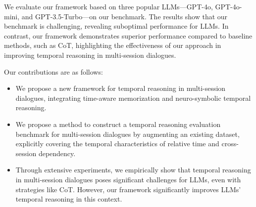 We evaluate our framework based on three popular LLMs—GPT-4o, GPT-4o-mini, and GPT-3.5-Turbo—on our benchmark. The results show that our benchmark is challenging, revealing suboptimal performance for LLMs. In contrast, our framework demonstrates superior performance compared to baseline methods, such as CoT, highlighting the effectiveness of our approach in improving temporal reasoning in multi-session dialogues.

Our contributions are as follows: 
\begin{itemize} 
    \item We propose a new framework for temporal reasoning in multi-session dialogues, integrating time-aware memorization and neuro-symbolic temporal reasoning. 
    \item We propose a method to construct a temporal reasoning evaluation benchmark for multi-session dialogues by augmenting an existing dataset, explicitly covering the temporal characteristics of relative time and cross-session dependency. 
    \item Through extensive experiments, we empirically show that temporal reasoning in multi-session dialogues poses significant challenges for LLMs, even with strategies like CoT. However, our framework significantly improves LLMs' temporal reasoning in this context. 
\end{itemize}
